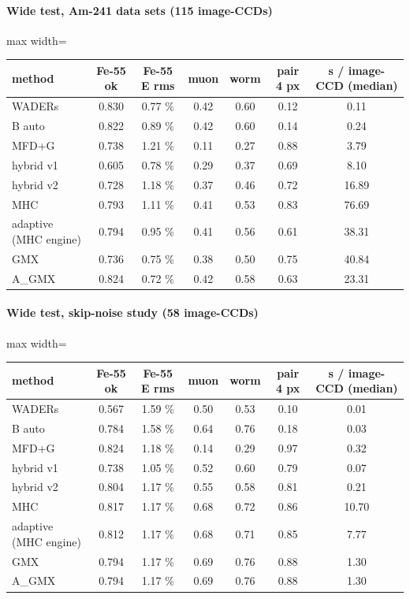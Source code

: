 \paragraph{Wide test, Am-241 data sets (115 image-CCDs)}
\begin{table}[H]\centering\footnotesize
\begin{adjustbox}{max width=\linewidth}
\begin{tabular}{lcccccc}
\toprule
method & Fe-55 ok & Fe-55 E rms & muon & worm & pair 4 px & s / image-CCD (median) \\
\midrule
WADERs & 0.830 & 0.77 \% & 0.42 & 0.60 & 0.12 & 0.11 \\
B auto & 0.822 & 0.89 \% & 0.42 & 0.60 & 0.14 & 0.24 \\
MFD+G & 0.738 & 1.21 \% & 0.11 & 0.27 & 0.88 & 3.79 \\
hybrid v1 & 0.605 & 0.78 \% & 0.29 & 0.37 & 0.69 & 8.10 \\
hybrid v2 & 0.728 & 1.18 \% & 0.37 & 0.46 & 0.72 & 16.89 \\
MHC & 0.793 & 1.11 \% & 0.41 & 0.53 & 0.83 & 76.69 \\
adaptive (MHC engine) & 0.794 & 0.95 \% & 0.41 & 0.56 & 0.61 & 38.31 \\
GMX & 0.736 & 0.75 \% & 0.38 & 0.50 & 0.75 & 40.84 \\
A\_GMX & 0.824 & 0.72 \% & 0.42 & 0.58 & 0.63 & 23.31 \\
\bottomrule
\end{tabular}
\end{adjustbox}
\end{table}

\paragraph{Wide test, skip-noise study (58 image-CCDs)}
\begin{table}[H]\centering\footnotesize
\begin{adjustbox}{max width=\linewidth}
\begin{tabular}{lcccccc}
\toprule
method & Fe-55 ok & Fe-55 E rms & muon & worm & pair 4 px & s / image-CCD (median) \\
\midrule
WADERs & 0.567 & 1.59 \% & 0.50 & 0.53 & 0.10 & 0.01 \\
B auto & 0.784 & 1.58 \% & 0.64 & 0.76 & 0.18 & 0.03 \\
MFD+G & 0.824 & 1.18 \% & 0.14 & 0.29 & 0.97 & 0.32 \\
hybrid v1 & 0.738 & 1.05 \% & 0.52 & 0.60 & 0.79 & 0.07 \\
hybrid v2 & 0.804 & 1.17 \% & 0.55 & 0.58 & 0.81 & 0.21 \\
MHC & 0.817 & 1.17 \% & 0.68 & 0.72 & 0.86 & 10.70 \\
adaptive (MHC engine) & 0.812 & 1.17 \% & 0.68 & 0.71 & 0.85 & 7.77 \\
GMX & 0.794 & 1.17 \% & 0.69 & 0.76 & 0.88 & 1.30 \\
A\_GMX & 0.794 & 1.17 \% & 0.69 & 0.76 & 0.88 & 1.30 \\
\bottomrule
\end{tabular}
\end{adjustbox}
\end{table}

